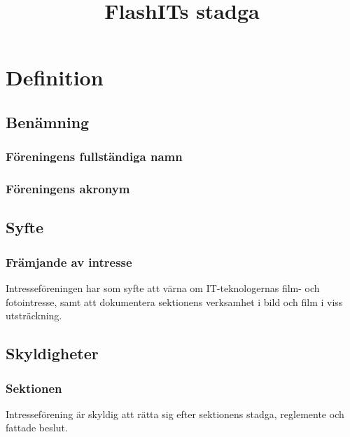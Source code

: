 \documentclass[11pt, noincludeaddress]{classes/cthit}
\begin{document}
\title{FlashITs stadga}
\maketitle

\thispagestyle{empty}

\newpage

\makeheadfoot%

\setcounter{tocdepth}{2}
\setcounter{page}{1}
\tableofcontents

\newpage

\section{Definition}

\subsection{Benämning}

\subsubsection{Föreningens fullständiga namn}
\FLASHITFULL{}

\subsubsection{Föreningens akronym}
\FLASHIT{}

\subsection{Syfte}

\subsubsection{Främjande av intresse}
Intresseföreningen har som syfte att värna om IT-teknologernas film- och fotointresse, samt att dokumentera sektionens verksamhet i bild och film i viss utsträckning.

\subsection{Skyldigheter}

\subsubsection{Sektionen}
Intresseförening är skyldig att rätta sig efter sektionens stadga, 
reglemente och fattade beslut. 
\end{document}
